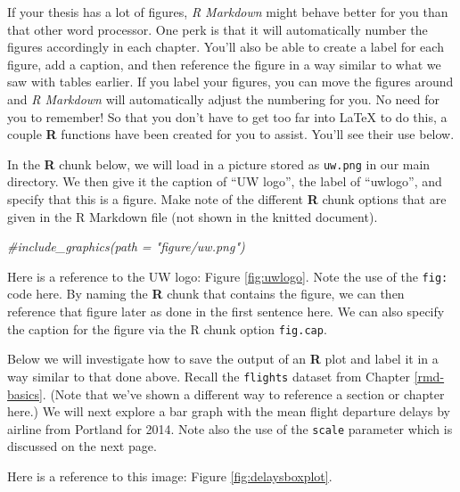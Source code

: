 \documentclass[twoside,12pt,final]{ucthesis-CA2012}
\newenvironment{Shaded}{}{}
\newcommand{\KeywordTok}[1]{\textcolor[rgb]{0.00,0.44,0.13}{\textbf{{#1}}}}
\newcommand{\DataTypeTok}[1]{\textcolor[rgb]{0.56,0.13,0.00}{{#1}}}
\newcommand{\StringTok}[1]{\textcolor[rgb]{0.25,0.44,0.63}{{#1}}}
\newcommand{\CommentTok}[1]{\textcolor[rgb]{0.38,0.63,0.69}{\textit{{#1}}}}
\newcommand{\NormalTok}[1]{{#1}}
\newcommand{\OperatorTok}[1]{\textcolor[rgb]{0.00,0.44,0.13}{\textbf{{#1}}}}
\begin{document}
\begin{ucmainmatter}
If your thesis has a lot of figures, \emph{R Markdown} might behave
better for you than that other word processor. One perk is that it will
automatically number the figures accordingly in each chapter. You'll
also be able to create a label for each figure, add a caption, and then
reference the figure in a way similar to what we saw with tables
earlier. If you label your figures, you can move the figures around and
\emph{R Markdown} will automatically adjust the numbering for you. No
need for you to remember! So that you don't have to get too far into
LaTeX to do this, a couple \textbf{R} functions have been created for
you to assist. You'll see their use below.

In the \textbf{R} chunk below, we will load in a picture stored as
\texttt{uw.png} in our main directory. We then give it the caption of
``UW logo'', the label of ``uwlogo'', and specify that this is a figure.
Make note of the different \textbf{R} chunk options that are given in
the R Markdown file (not shown in the knitted document).
\begin{Shaded}
\begin{Highlighting}[]
\CommentTok{#include_graphics(path = "figure/uw.png")}
\end{Highlighting}
\end{Shaded}
Here is a reference to the UW logo: Figure \ref{fig:uwlogo}. Note the
use of the \texttt{fig:} code here. By naming the \textbf{R} chunk that
contains the figure, we can then reference that figure later as done in
the first sentence here. We can also specify the caption for the figure
via the R chunk option \texttt{fig.cap}.

\clearpage

Below we will investigate how to save the output of an \textbf{R} plot
and label it in a way similar to that done above. Recall the
\texttt{flights} dataset from Chapter \ref{rmd-basics}. (Note that we've
shown a different way to reference a section or chapter here.) We will
next explore a bar graph with the mean flight departure delays by
airline from Portland for 2014. Note also the use of the \texttt{scale}
parameter which is discussed on the next page.
\begin{Shaded}
\end{Shaded}
Here is a reference to this image: Figure \ref{fig:delaysboxplot}.


\end{ucmainmatter}
\end{document}
